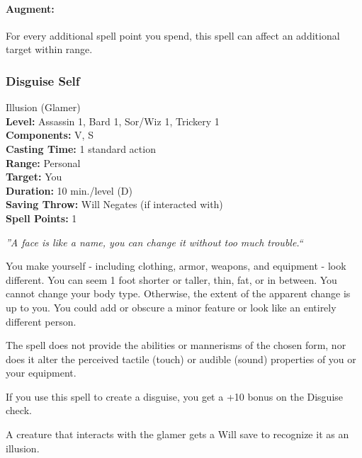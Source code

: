 \paragraph{Augment:} For every additional spell point you spend, this spell can affect an additional target within range.
\subsubsection{Disguise Self}
\label{Spell:DisguiseSelf}
Illusion (Glamer)
\\ \textbf{Level:} Assassin 1, Bard 1, Sor/Wiz 1, Trickery 1
\\ \textbf{Components:} V, S
\\ \textbf{Casting Time:} 1 standard action
\\ \textbf{Range:} Personal
\\ \textbf{Target:} You
\\ \textbf{Duration:} 10 min./level (D)
\\ \textbf{Saving Throw:} Will Negates (if interacted with)
\\ \textbf{Spell Points:} 1

\emph{''A face is like a name, you can change it without too much trouble.``}

You make yourself - including clothing, armor, weapons, and equipment - look different. 
You can seem 1 foot shorter or taller, thin, fat, or in between. 
You cannot change your body type. Otherwise, the extent of the apparent change is up to you. 
You could add or obscure a minor feature or look like an entirely different person.

The spell does not provide the abilities or mannerisms of the chosen form, nor does it alter the perceived tactile (touch) or audible (sound) properties of you or your equipment.

If you use this spell to create a disguise, you get a +10 bonus on the Disguise check.

A creature that interacts with the glamer gets a Will save to recognize it as an illusion.


